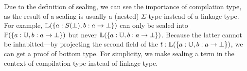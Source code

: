 


Due to the definition of sealing, we can see the importance of compilation type, as the result of a sealing is usually a (nested) $\Sigma$-type instead of a linkage type. For example, $\mathbb{L}({\{a : S(\bot), b : a \to \bot\}})$ can only be sealed into $\mathbb{P}({\{a : \mathbb{U}, b : a \to \bot\}})$ but never $\mathbb{L}({\{a : \mathbb{U}, b : a \to \bot\}})$. Because the latter cannot be inhabitted---by projecting the second field of the $ t : \mathbb{L}({\{a : \mathbb{U}, b : a \to \bot\}})$, we can get a proof of bottom type. For simplicity, we make sealing a term in the context of compilation type instead of linkage type.



